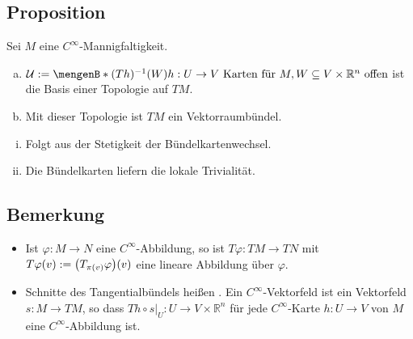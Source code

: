 \subsection[Proposition: Topologie auf $T M$, die $T M$ zu einem Vektorraumbündel macht]{Proposition} %
\label{sub:198}
Sei $M$ eine $C^\infty$-Mannigfaltigkeit.
\begin{enumerate}[a)]
	\item $\mathcal{U} := \set[(T h) ^{-1} (W)]{h : U \to V \text{ Karten für }M , W \subseteq V \times\mathds{R}^n \text{ offen}} $ ist die Basis einer Topologie auf $T M$.
	\item Mit dieser Topologie ist $T M$ ein Vektorraumbündel.
\end{enumerate}
\begin{enumerate}[(i)]
	\item Folgt aus der Stetigkeit der Bündelkartenwechsel.
	\item Die Bündelkarten liefern die lokale Trivialität. \bewende
\end{enumerate}

\subsection[Bemerkung: $T \varphi : T M  \to T N$ ist linear, Vektorfelder als Schnitte von $T M$]{Bemerkung} %
\label{sub:199}
\begin{itemize}
	\item Ist $\varphi : M \to N$ eine $C^\infty$-Abbildung, so ist $T \varphi : T M  \to T N$ mit $T \varphi(v) := \enbrace*{T_{\pi(v)} \varphi}(v)$ eine lineare Abbildung 
	über $\varphi$.
	\item Schnitte des Tangentialbündels heißen . Ein $C^\infty$-Vektorfeld ist ein Vektorfeld $s : M \to T M$, so dass 
	$T h \circ s \big|_{U} : U \to V \times \mathds{R}^n$ für jede $C^\infty$-Karte $h : U \to V$ von $M$ eine $C^\infty$-Abbildung ist.
\end{itemize}



